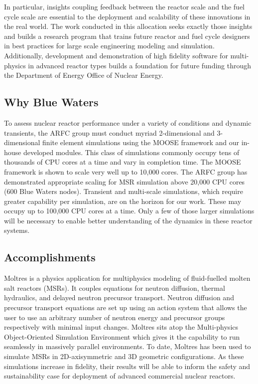 \documentclass[letterpaper]{article}
\begin{document}
In particular, insights coupling feedback between the reactor scale and the
fuel cycle scale are essential to the deployment and scalability of these
innovations in the real world. The work conducted in this allocation seeks
exactly those insights and builds a research program that trains future
reactor and fuel cycle designers in best practices for large scale engineering 
modeling and simulation. Additionally, development and demonstration
of high fidelity software for multi-physics in advanced reactor types builds a
foundation for future funding through the Department of Energy Office of
Nuclear Energy. 


\subsection{Why Blue Waters} To assess nuclear reactor performance under a
variety of conditions and dynamic transients, the ARFC group must conduct
myriad 2-dimensional and 3-dimensional finite element simulations using the
MOOSE framework and our in-house developed modules. This class of simulations commonly
occupy tens of thousands of CPU cores at a time and vary in completion time.
The MOOSE framework is shown to scale very well up to 10,000 cores. The ARFC
group has demonstrated appropriate scaling for MSR simulation above 20,000 CPU
cores (600 Blue Waters nodes). Transient and multi-scale simulations, which
require greater capability per simulation, are on the horizon for our work.
These may occupy up to 100,000 CPU cores at a time. Only a few of those larger
simulations will be necessary to enable better understanding of the dynamics in
these reactor systems.

\subsection{Accomplishments} 
Moltres \cite{lindsay_arfc/moltres:_2017} is
a physics application for multiphysics modeling of fluid-fuelled molten salt
reactors (MSRs). It couples equations for neutron diffusion, thermal
hydraulics, and delayed neutron precursor transport. Neutron diffusion and
precursor transport equations are set up using an action system that allows the
user to use an arbitrary number of neutron energy and precursor groups
respectively with minimal input changes. Moltres sits atop the Multi-physics
Object-Oriented Simulation Environment \cite{gaston_moose:_2009} which gives it the
capability to run seamlessly in massively parallel environments. To date,
Moltres has been used to simulate MSRs in 2D-axisymmetric and 3D geometric
configurations. As these simulations increase in fidelity, their results will
be able to inform the safety and sustainability case for deployment of advanced
commercial nuclear reactors.
\end{document}
